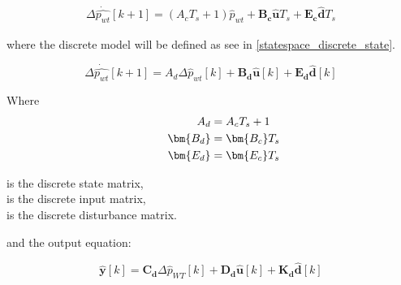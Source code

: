 \begin{equation}
  \begin{split}
  \Delta\dot{\hat{p_{wt}}}[k+1] = (A_cT_s+1)\hat{p}_{wt}+\bm{B_c\hat{u}}T_s+\bm{E_c\hat{d}}T_s
  \end{split}
  \label{eq:dist_statespace_forward_euler}
\end{equation}

where the discrete model will be defined as see in \eqref{statespace_discrete_state}.

\begin{equation}
\Delta\dot{\hat{p_{wt}}}[k+1]  = A_d \Delta \hat{p}_{wt}[k]  + \bm{B_d} \bm{\hat{u}}[k] + \bm{E_d} \bm{\hat{d}}[k] 
 \label{statespace_discrete_state}
\end{equation}

\begin{minipage}[t]{0.2\textwidth}
Where\vspace{-3mm}
\hspace*{8mm}\begin{equation*}
\begin{split}
 \hspace*{8mm} A_d &= A_cT_s+1  \\
 \hspace*{8mm} \bm{B_d} &= \bm{B_c}T_s\\
 \hspace*{8mm} \bm{E_d} &= \bm{E_c}T_s
 \end{split}
 \end{equation*}
\end{minipage}
\begin{minipage}[t]{0.78\textwidth}
\vspace{2mm}\hspace*{8mm}is the discrete state matrix, \\
\vspace{2mm}\hspace*{8mm}is the discrete input matrix, \\
\hspace*{8mm}is the discrete disturbance matrix. \\ 
\end{minipage}

and the output equation:

\begin{equation}
  \bm{\hat{y}}[k] = \bm{C_d} \Delta \hat{p}_{WT}[k] + \bm{D_d} \bm{\hat{u}}[k] + \bm{K_d} \bm{\hat{d}}[k]
\label{statespace_control_output_discrete}
\end{equation}

